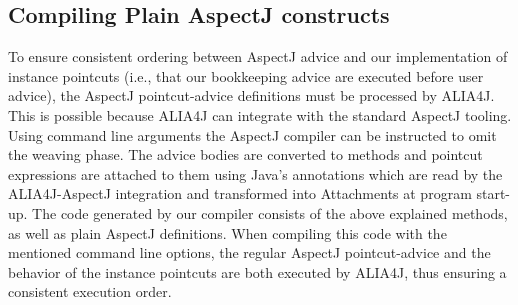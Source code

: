 \subsection{Compiling Plain AspectJ constructs}
To ensure consistent ordering between AspectJ advice and our implementation of instance pointcuts (i.e., that our bookkeeping advice are executed before user advice), the AspectJ point\-cut-advice definitions must be processed by ALIA4J.
This is possible because ALIA4J can integrate with the standard AspectJ tooling.
Using command line arguments the AspectJ compiler can be instructed to omit the weaving phase.
The advice bodies are converted to methods and pointcut expressions are attached to them using Java's annotations which are read by the ALIA4J-AspectJ integration and transformed into Attachments at program start-up.
The code generated by our compiler consists of the above explained methods, as well as plain AspectJ definitions.
When compiling this code with the mentioned command line options, the regular AspectJ pointcut-advice and the behavior of the instance pointcuts are both executed by ALIA4J, thus ensuring a consistent execution order.

